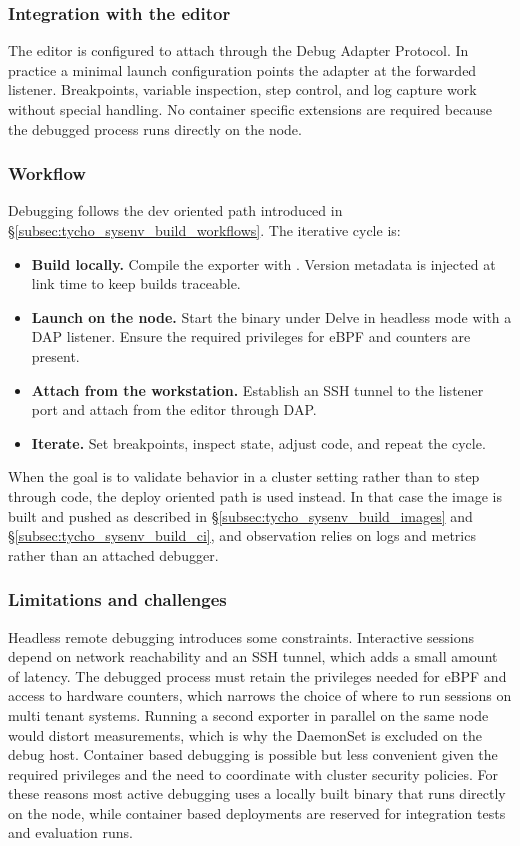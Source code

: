 \subsubsection{Integration with the editor}
\label{subsec:tycho_sysenv_debug_ide}
The editor is configured to attach through the Debug Adapter Protocol. In practice a minimal launch configuration points the adapter at the forwarded listener. Breakpoints, variable inspection, step control, and log capture work without special handling. No container specific extensions are required because the debugged process runs directly on the node.

\subsubsection{Workflow}
\label{subsec:tycho_sysenv_debug_workflow}
Debugging follows the dev oriented path introduced in \S\ref{subsec:tycho_sysenv_build_workflows}. The iterative cycle is:
\begin{itemize}
  \item \textbf{Build locally.} Compile the exporter with . Version metadata is injected at link time to keep builds traceable.
  \item \textbf{Launch on the node.} Start the binary under Delve in headless mode with a DAP listener. Ensure the required privileges for eBPF and counters are present.
  \item \textbf{Attach from the workstation.} Establish an SSH tunnel to the listener port and attach from the editor through DAP.
  \item \textbf{Iterate.} Set breakpoints, inspect state, adjust code, and repeat the cycle.
\end{itemize}
When the goal is to validate behavior in a cluster setting rather than to step through code, the deploy oriented path is used instead. In that case the image is built and pushed as described in \S\ref{subsec:tycho_sysenv_build_images} and \S\ref{subsec:tycho_sysenv_build_ci}, and observation relies on logs and metrics rather than an attached debugger.

\subsubsection{Limitations and challenges}
\label{subsec:tycho_sysenv_debug_limits}
Headless remote debugging introduces some constraints. Interactive sessions depend on network reachability and an SSH tunnel, which adds a small amount of latency. The debugged process must retain the privileges needed for eBPF and access to hardware counters, which narrows the choice of where to run sessions on multi tenant systems. Running a second exporter in parallel on the same node would distort measurements, which is why the DaemonSet is excluded on the debug host. Container based debugging is possible but less convenient given the required privileges and the need to coordinate with cluster security policies. For these reasons most active debugging uses a locally built binary that runs directly on the node, while container based deployments are reserved for integration tests and evaluation runs.

